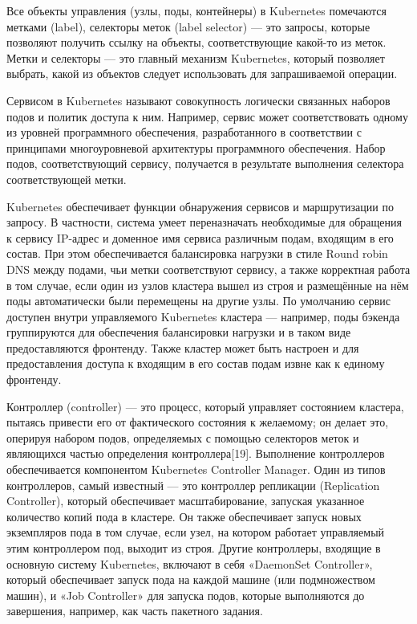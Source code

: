 Все объекты управления (узлы, поды, контейнеры) в Kubernetes помечаются метками (label), селекторы меток (label selector) --- это запросы, которые позволяют получить ссылку на объекты, соответствующие какой-то из меток. Метки и селекторы — это главный механизм Kubernetes, который позволяет выбрать, какой из объектов следует использовать для запрашиваемой операции.

Сервисом в Kubernetes называют совокупность логически связанных наборов подов и политик доступа к ним. Например, сервис может соответствовать одному из уровней программного обеспечения, разработанного в соответствии с принципами многоуровневой архитектуры программного обеспечения. Набор подов, соответствующий сервису, получается в результате выполнения селектора соответствующей метки.

Kubernetes обеспечивает функции обнаружения сервисов и маршрутизации по запросу. В частности, система умеет переназначать необходимые для обращения к сервису IP-адрес и доменное имя сервиса различным подам, входящим в его состав. При этом обеспечивается балансировка нагрузки в стиле Round robin DNS между подами, чьи метки соответствуют сервису, а также корректная работа в том случае, если один из узлов кластера вышел из строя и размещённые на нём поды автоматически были перемещены на другие узлы. По умолчанию сервис доступен внутри управляемого Kubernetes кластера --- например, поды бэкенда группируются для обеспечения балансировки нагрузки и в таком виде предоставляются фронтенду. Также кластер может быть настроен и для предоставления доступа к входящим в его состав подам извне как к единому фронтенду.

Контроллер (controller) --- это процесс, который управляет состоянием кластера, пытаясь привести его от фактического состояния к желаемому; он делает это, оперируя набором подов, определяемых с помощью селекторов меток и являющихся частью определения контроллера[19]. Выполнение контроллеров обеспечивается компонентом Kubernetes Controller Manager. Один из типов контроллеров, самый известный — это контроллер репликации (Replication Controller), который обеспечивает масштабирование, запуская указанное количество копий пода в кластере. Он также обеспечивает запуск новых экземпляров пода в том случае, если узел, на котором работает управляемый этим контроллером под, выходит из строя. Другие контроллеры, входящие в основную систему Kubernetes, включают в себя «DaemonSet Controller», который обеспечивает запуск пода на каждой машине (или подмножеством машин), и «Job Controller» для запуска подов, которые выполняются до завершения, например, как часть пакетного задания.

